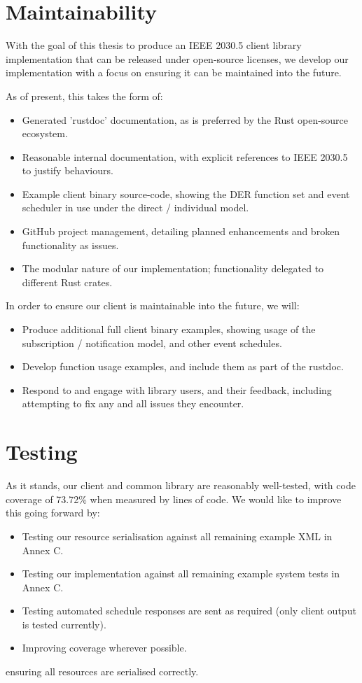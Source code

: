 \section{Maintainability}
With the goal of this thesis to produce an IEEE 2030.5 client library implementation that can be released under open-source licenses, we develop our implementation with a focus on ensuring it can be maintained into the future. 

As of present, this takes the form of:

\begin{itemize}
    \item Generated 'rustdoc' documentation, as is preferred by the Rust open-source ecosystem.
    \item Reasonable internal documentation, with explicit references to IEEE 2030.5 to justify behaviours.
    \item Example client binary source-code, showing the DER function set and event scheduler in use under the direct / individual model.
    \item GitHub project management, detailing planned enhancements and broken functionality as issues.
    \item The modular nature of our implementation; functionality delegated to different Rust crates.
\end{itemize}

In order to ensure our client is maintainable into the future, we will:

\begin{itemize}
    \item Produce additional full client binary examples, showing usage of the subscription / notification model, and other event schedules.
    \item Develop function usage examples, and include them as part of the rustdoc.
    \item Respond to and engage with library users, and their feedback, including attempting to fix any and all issues they encounter.
\end{itemize}

\section{Testing}
As it stands, our client and common library are reasonably well-tested, with code coverage of 73.72\% when measured by lines of code. We would like to improve this going forward by:

\begin{itemize}
	\item Testing our resource serialisation against all remaining example XML in Annex C.
	\item Testing our implementation against all remaining example system tests in Annex C.
	\item Testing automated schedule responses are sent as required (only client output is tested currently).
	\item Improving coverage wherever possible.
\end{itemize}
ensuring all resources are serialised correctly.

